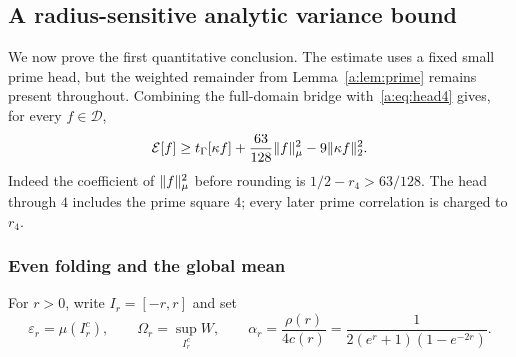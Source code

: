 \documentclass[11pt,a4paper]{article}
\numberwithin{equation}{section}
\theoremstyle{definition}\newtheorem{definition}[theorem]{Definition}
\theoremstyle{remark}\newtheorem{remark}[theorem]{Remark}
\newcommand{\E}{\mathcal E}\newcommand{\D}{\mathcal D}
\newcommand{\tg}{t_\Gamma}\newcommand{\cg}{c_\Gamma}
\begin{document}
\subsection{A radius-sensitive analytic variance bound}\label{a:sec:seed}

We now prove the first quantitative conclusion. The estimate uses a fixed small prime head, but the weighted remainder from Lemma~\ref{a:lem:prime} remains present throughout. Combining the full-domain bridge with~\eqref{a:eq:head4} gives, for every $f\in\D$,
\begin{equation}\label{a:eq:masscontrol}
 \E[f]\ge\tg[\kappa f]+\frac{63}{128}\norm f_\mu^2
                         -9\norm{\kappa f}_2^2.
\end{equation}
Indeed the coefficient of $\lVert f\rVert_\mu^2$ before rounding is $1/2-r_4>63/128$. The head through $4$ includes the prime square $4$; every later prime correlation is charged to $r_4$.

\subsubsection{Even folding and the global mean}

For $r>0$, write $I_r=[-r,r]$ and set
\begin{equation}\label{a:eq:radiusdata}
 \varepsilon_r=\mu(I_r^c),\qquad
 \Omega_r=\sup_{I_r^c}W,\qquad
 \alpha_r=\frac{\rho(r)}{4c(r)}
 =\frac1{2(e^r+1)(1-e^{-2r})}.
\end{equation}
\end{document}
